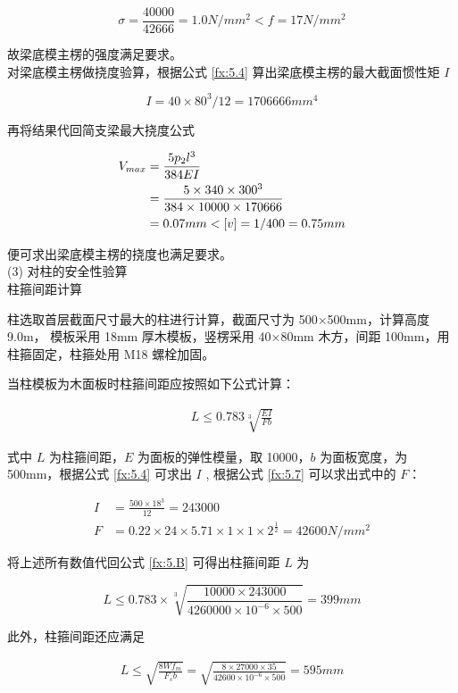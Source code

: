 \[
    \sigma = \frac{40000}{42666}=1.0 N/mm^2< f=17N/mm^2
\]

故梁底模主楞的强度满足要求。\\

对梁底模主楞做挠度验算，根据公式 \ref{fx:5.4} 算出梁底模主楞的最大截面惯性矩 $I$

\[
    I=40\times 80^3 /12=1706666 mm^4
\]

再将结果代回简支梁最大挠度公式 

\begin{align}
    V_{max}&=\frac{5p_2l^3}{384EI}\\
    &=\frac{5\times 340\times 300^3}{384\times 10000\times 170666} \notag \\
    &=0.07mm<[v]=1/400=0.75mm \notag
\end{align}

便可求出梁底模主楞的挠度也满足要求。\\

(3) 对柱的安全性验算\\

 柱箍间距计算

柱选取首层截面尺寸最大的柱进行计算，截面尺寸为 500×500mm，计算高度 9.0m， 模板采用 18mm 厚木模板，竖楞采用 40×80mm 木方，间距 100mm，用柱箍固定，柱箍处用 M18 螺栓加固。

当柱模板为木面板时柱箍间距应按照如下公式计算：

\begin{align}
    \label{fx:5.B}
    L \leq 0.783\sqrt[3]{\frac{EI}{Fb}}
\end{align}

式中 $L$ 为柱箍间距，$E$ 为面板的弹性模量，取 10000，$b$ 为面板宽度，为 500mm，根据公式 \ref{fx:5.4} 可求出 $I$ ,
根据公式 \ref{fx:5.7} 可以求出式中的 $F$：

\begin{align*}
I&=\frac{500\times 18^3}{12}=243000\\
F&=0.22\times 24\times 5.71\times 1\times 1\times 2^{\frac{1}{2}}=42600 N/mm^2
\end{align*}

将上述所有数值代回公式 \ref{fx:5.B} 可得出柱箍间距 $L$ 为

\[L \leq 0.783\times \sqrt[3]{\frac{10000\times 243000}{4260000\times 10^{-6}\times 500}}=399mm\]

此外，柱箍间距还应满足

\begin{align}
    \label{fx:5.C}
    L \leq \sqrt{\frac{8Wf_m}{F_sb}}=\sqrt{\frac{8\times 27000\times 35}{42600\times 10^{-6}\times 500}}=595 mm
\end{align}


